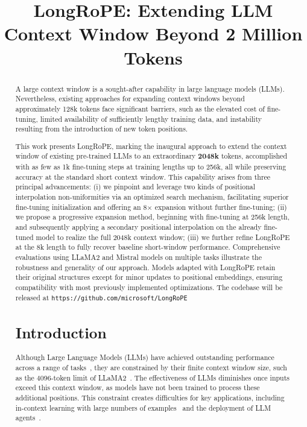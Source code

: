 \title{LongRoPE: Extending LLM Context Window Beyond 2 Million Tokens}

\begin{abstract}
A large context window is a sought-after capability in large language models (LLMs). Nevertheless, existing approaches for expanding context windows beyond approximately 128k tokens face significant barriers, such as the elevated cost of fine-tuning, limited availability of sufficiently lengthy training data, and instability resulting from the introduction of new token positions.

This work presents LongRoPE, marking the inaugural approach to extend the context window of existing pre-trained LLMs to an extraordinary \textbf{2048k} tokens, accomplished with as few as 1k fine-tuning steps at training lengths up to 256k, all while preserving accuracy at the standard short context window. This capability arises from three principal advancements: (i) we pinpoint and leverage two kinds of positional interpolation non-uniformities via an optimized search mechanism, facilitating superior fine-tuning initialization and offering an 8$\times$ expansion without further fine-tuning; (ii) we propose a progressive expansion method, beginning with fine-tuning at 256k length, and subsequently applying a secondary positional interpolation on the already fine-tuned model to realize the full 2048k context window; (iii) we further refine LongRoPE at the 8k length to fully recover baseline short-window performance. Comprehensive evaluations using LLaMA2 and Mistral models on multiple tasks illustrate the robustness and generality of our approach. Models adapted with LongRoPE retain their original structures except for minor updates to positional embeddings, ensuring compatibility with most previously implemented optimizations. The codebase will be released at \texttt{https://github.com/microsoft/LongRoPE}

\section{Introduction}

Although Large Language Models (LLMs) have achieved outstanding performance across a range of tasks~\cite{gpt4,llama2}, they are constrained by their finite context window size, such as the 4096-token limit of LLaMA2~\cite{llama2}. The effectiveness of LLMs diminishes once inputs exceed this context window, as models have not been trained to process these additional positions. This constraint creates difficulties for key applications, including in-context learning with large numbers of examples~\cite{Huang2023FewerIM} and the deployment of LLM agents~\cite{park2023generative,madaan2023selfrefine}.


\end{abstract}
